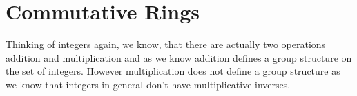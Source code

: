 



\section{Commutative Rings}
Thinking of integers again, we know, that there are actually two operations addition and multiplication and as we know addition defines a group structure on the set of integers. However multiplication does not define a group structure as we know that integers in general don't have multiplicative inverses.

